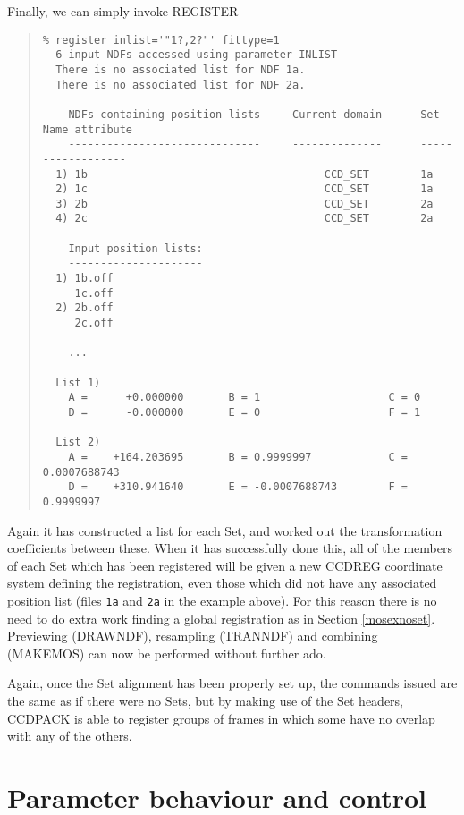 \documentclass[twoside,11pt]{article}
\newcommand{\htmlref}[2]{#1}
\renewcommand{\_}{\texttt{\symbol{95}}}
\newenvironment{myquote}{\begin{quote}\begin{small}}{\end{small}\end{quote}}
\newcommand{\text}[1]{{\small \tt #1}}
\newcommand{\xroutine}[1]{\htmlref{{\sc #1}}{#1}}
\begin{document}
Finally, we can simply invoke \xroutine{REGISTER}
\begin{myquote}
\begin{verbatim}
% register inlist='"1?,2?"' fittype=1
  6 input NDFs accessed using parameter INLIST
  There is no associated list for NDF 1a.
  There is no associated list for NDF 2a.

    NDFs containing position lists     Current domain      Set Name attribute
    ------------------------------     --------------      ------------------
  1) 1b                                     CCD_SET        1a
  2) 1c                                     CCD_SET        1a
  3) 2b                                     CCD_SET        2a
  4) 2c                                     CCD_SET        2a

    Input position lists:
    ---------------------
  1) 1b.off
     1c.off
  2) 2b.off
     2c.off

    ...

  List 1)
    A =      +0.000000       B = 1                    C = 0
    D =      -0.000000       E = 0                    F = 1

  List 2)
    A =    +164.203695       B = 0.9999997            C = 0.0007688743
    D =    +310.941640       E = -0.0007688743        F = 0.9999997
\end{verbatim}
\end{myquote}
Again it has constructed a list for each Set, and worked out the
transformation coefficients between these.
When it has successfully done this, all of the members of each Set
which has been registered will be given a new CCD\_REG coordinate
system defining the registration, even those which did not 
have any associated position list (files \text{1a} and \text{2a} in the
example above).
For this reason there is no need to do extra work finding a 
global registration as in Section \ref{mosexnoset}.
Previewing (\xroutine{DRAWNDF}), resampling (\xroutine{TRANNDF}) and
combining (\xroutine{MAKEMOS}) can now be performed without further ado.

Again, once the Set alignment has been properly set up,
the commands issued are the same as if there were no Sets,
but by making use of the Set headers, CCDPACK is able to register
groups of frames in which some have no overlap with any of the others.

\section{Parameter behaviour and control}
\end{document}
